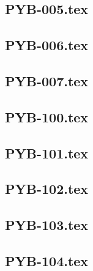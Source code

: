 \renewcommand{\xxexo}{PYB-005.tex} 
\subsection*{\xxexo} 
\graphicspath{{../../exospython_bases/equadiffs/\xxexo/}}
 
 
\renewcommand{\xxexo}{PYB-006.tex} 
\subsection*{\xxexo} 
\graphicspath{{../../exospython_bases/equadiffs/\xxexo/}}
 
 
\renewcommand{\xxexo}{PYB-007.tex} 
\subsection*{\xxexo} 
\graphicspath{{../../exospython_bases/equadiffs/\xxexo/}}
 
 
\renewcommand{\xxexo}{PYB-100.tex} 
\subsection*{\xxexo} 
\graphicspath{{../../exospython_bases/equadiffs/\xxexo/}}
 
 
\renewcommand{\xxexo}{PYB-101.tex} 
\subsection*{\xxexo} 
\graphicspath{{../../exospython_bases/equadiffs/\xxexo/}}
 
 
\renewcommand{\xxexo}{PYB-102.tex} 
\subsection*{\xxexo} 
\graphicspath{{../../exospython_bases/equadiffs/\xxexo/}}
 
 
\renewcommand{\xxexo}{PYB-103.tex} 
\subsection*{\xxexo} 
\graphicspath{{../../exospython_bases/equadiffs/\xxexo/}}
 
 
\renewcommand{\xxexo}{PYB-104.tex} 
\subsection*{\xxexo} 
\graphicspath{{../../exospython_bases/equadiffs/\xxexo/}}
 
 
